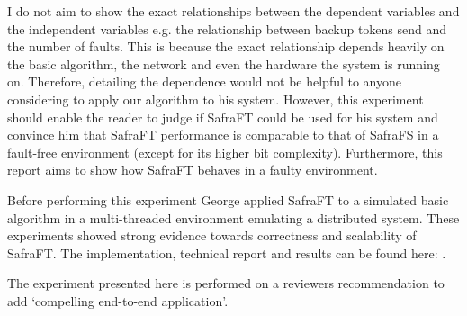 I do not aim to show the exact relationships between the dependent variables and the independent variables e.g. the relationship between backup tokens send and the number of faults.
This is because the exact relationship depends heavily on the basic algorithm, the network and even the hardware the system is running on.
Therefore, detailing the dependence would not be helpful to anyone considering to apply our algorithm to his system.
However, this experiment should enable the reader to judge if SafraFT could be used for his system and convince him that SafraFT performance is comparable to that of SafraFS in a fault-free environment (except for its higher bit complexity).
Furthermore, this report aims to show how SafraFT behaves in a faulty environment.

\begin{comment}
Hypothesis
Safra compares to safra without signficant changes in with no failures on all network sizes
tokens
tokens after termination

no signifcant change in token forwarding
time ??
no hard, complicated computations
time after termination
no hard, complicated computations and no change in token forwarding

our Safra has higher bit complexity 
increases linearly with network size network size of 1 == then upwards linearly

Influence from faults
backup tokens == number of faults - not correct
difference caused by backup tokens / network size under same fault conditions?
reason:  // Not to write here
node gets to know about failing node because of token
e.g. if its a bit further out and it gets the crashed message later
node crash behind each other in the ring and only one backup token is send?
Token count increases for a low level of faults as it colors nodes black and incurs in further rounds when node detects crash or when nodes gets to know of crash of successor    x
These are mostly done during computation because CM is not processing heavy and gets passive a lot
-> No change on tokens after termination
Token count and time decrease for a high level of fault as network size is reduced. 
Same for time spent

Average token size grows as the crashes are propagated by the token each of them takes one round so impact on average token size depends on network size and the signficance also on number of rounds
more noticable for many faults but than there are also less tokens also in that round
\end{comment}



Before performing this experiment George applied SafraFT to a simulated basic algorithm in a multi-threaded environment emulating a distributed system.
These experiments showed strong evidence towards correctness and scalability of SafraFT.
The implementation, technical report and results can be found here: \cite{georgework}.

The experiment presented here is performed on a reviewers recommendation to add `compelling end-to-end application'.
